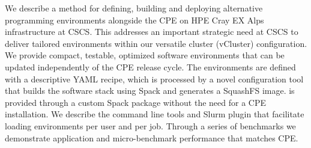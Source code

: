 We describe a method for defining, building and deploying alternative programming environments alongside the CPE on HPE Cray EX Alps infrastructure at CSCS.
This addresses an important strategic need at CSCS to deliver tailored environments within our versatile cluster (vCluster) configuration.
We provide compact, testable, optimized software environments that can be updated independently of the CPE release cycle.
The environments are defined with a descriptive YAML recipe, which is processed by a novel configuration tool that builds the software stack using Spack and generates a SquashFS image.
\craympich is provided through a custom Spack package without the need for a CPE installation.
We describe the command line tools and Slurm plugin that facilitate loading environments per user and per job.
Through a series of benchmarks we demonstrate application and micro-benchmark performance that matches CPE.

